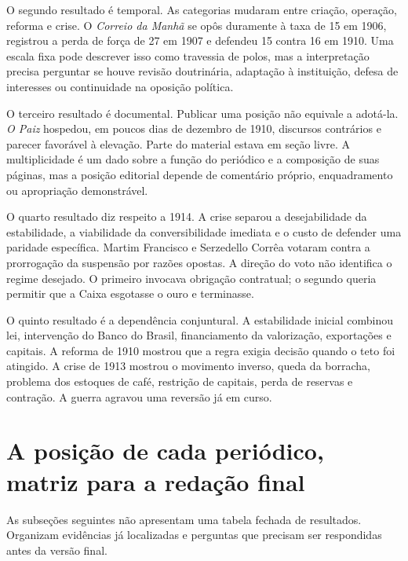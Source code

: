 O segundo resultado é temporal. As categorias mudaram entre criação, operação, reforma e crise. O \textit{Correio da Manhã} se opôs duramente à taxa de 15 em 1906, registrou a perda de força de 27 em 1907 e defendeu 15 contra 16 em 1910. Uma escala fixa pode descrever isso como travessia de polos, mas a interpretação precisa perguntar se houve revisão doutrinária, adaptação à instituição, defesa de interesses ou continuidade na oposição política.

O terceiro resultado é documental. Publicar uma posição não equivale a adotá-la. \textit{O Paiz} hospedou, em poucos dias de dezembro de 1910, discursos contrários e parecer favorável à elevação. Parte do material estava em seção livre. A multiplicidade é um dado sobre a função do periódico e a composição de suas páginas, mas a posição editorial depende de comentário próprio, enquadramento ou apropriação demonstrável.

O quarto resultado diz respeito a 1914. A crise separou a desejabilidade da estabilidade, a viabilidade da conversibilidade imediata e o custo de defender uma paridade específica. Martim Francisco e Serzedello Corrêa votaram contra a prorrogação da suspensão por razões opostas. A direção do voto não identifica o regime desejado. O primeiro invocava obrigação contratual; o segundo queria permitir que a Caixa esgotasse o ouro e terminasse.

O quinto resultado é a dependência conjuntural. A estabilidade inicial combinou lei, intervenção do Banco do Brasil, financiamento da valorização, exportações e capitais. A reforma de 1910 mostrou que a regra exigia decisão quando o teto foi atingido. A crise de 1913 mostrou o movimento inverso, queda da borracha, problema dos estoques de café, restrição de capitais, perda de reservas e contração. A guerra agravou uma reversão já em curso.


\section{A posição de cada periódico, matriz para a redação final}

As subseções seguintes não apresentam uma tabela fechada de resultados. Organizam evidências já localizadas e perguntas que precisam ser respondidas antes da versão final.

